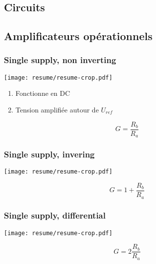 \documentclass[]{article}
\begin{document}
\begin{multicols}{3}
\section{Circuits}
\subsection{Amplificateurs opérationnels}
\subsubsection{Single supply, non inverting}
\begin{center}
\texttt{[image: resume/resume-crop.pdf]}
\end{center}
\begin{enumerate}
\item Fonctionne en DC
\item Tension amplifiée autour de $U_{ref}$
\end{enumerate}
$$G=\frac{R_b}{R_a}$$
\subsubsection{Single supply, invering}
\begin{center}
\texttt{[image: resume/resume-crop.pdf]}
\end{center}
$$G=1+\frac{R_b}{R_a}$$
\subsubsection{Single supply, differential}
\begin{center}
\texttt{[image: resume/resume-crop.pdf]}
\end{center}
$$G=2\frac{R_b}{R_a}$$


\end{multicols}
\end{document}
